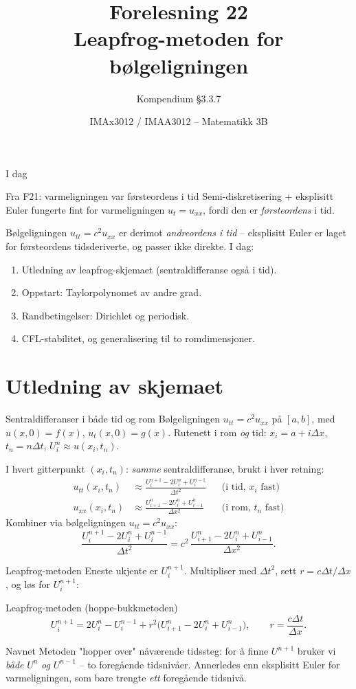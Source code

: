\documentclass[11pt,aspectratio=169]{beamer}
\title[F22 -- Leapfrog]{Forelesning 22\\ Leapfrog-metoden for bølgeligningen}
\subtitle{Kompendium §3.3.7}
\author{IMAx3012 / IMAA3012 -- Matematikk 3B}
\date{}
\begin{document}
\begin{frame}
\titlepage
\end{frame}

\begin{frame}{I dag}
\begin{remb}{Fra F21: varmeligningen var førsteordens i tid}
Semi-diskretisering + eksplisitt Euler fungerte fint for varmeligningen $u_t=u_{xx}$, fordi den er \emph{førsteordens} i tid.
\end{remb}
Bølgeligningen $u_{tt}=c^2u_{xx}$ er derimot \emph{andreordens i tid} -- eksplisitt Euler er laget for førsteordens tidsderiverte, og passer ikke direkte. I dag:
\begin{enumerate}
\item Utledning av leapfrog-skjemaet (sentraldifferanse også i tid).
\item Oppstart: Taylorpolynomet av andre grad.
\item Randbetingelser: Dirichlet og periodisk.
\item CFL-stabilitet, og generalisering til to romdimensjoner.
\end{enumerate}
\end{frame}

\section{Utledning av skjemaet}

\begin{frame}{Sentraldifferanser i både tid og rom}
Bølgeligningen $u_{tt}=c^2u_{xx}$ på $[a,b]$, med $u(x,0)=f(x)$, $u_t(x,0)=g(x)$. Rutenett i rom \emph{og} tid: $x_i=a+i\Delta x$, $t_n=n\Delta t$, $U_i^n\approx u(x_i,t_n)$.

\medskip
I hvert gitterpunkt $(x_i,t_n)$: \emph{samme} sentraldifferanse, brukt i hver retning:
\begin{align*}
u_{tt}(x_i,t_n) &\approx \frac{U_i^{n+1}-2U_i^n+U_i^{n-1}}{\Delta t^2} && \text{(i tid, $x_i$ fast)}\\[0.3em]
u_{xx}(x_i,t_n) &\approx \frac{U_{i+1}^n-2U_i^n+U_{i-1}^n}{\Delta x^2} && \text{(i rom, $t_n$ fast)}
\end{align*}
Kombiner via bølgeligningen $u_{tt}=c^2u_{xx}$:
\[
\frac{U_i^{n+1}-2U_i^n+U_i^{n-1}}{\Delta t^2} = c^2\,\frac{U_{i+1}^n-2U_i^n+U_{i-1}^n}{\Delta x^2}.
\]
\end{frame}

\begin{frame}{Leapfrog-metoden}
Eneste ukjente er $U_i^{n+1}$. Multipliser med $\Delta t^2$, sett $r=c\Delta t/\Delta x$, og løs for $U_i^{n+1}$:
\begin{oppsumb}{Leapfrog-metoden (hoppe-bukkmetoden)}
\[
U_i^{n+1} = 2U_i^n - U_i^{n-1} + r^2\big(U_{i+1}^n-2U_i^n+U_{i-1}^n\big), \qquad r = \frac{c\Delta t}{\Delta x}.
\]
\end{oppsumb}
\begin{remb}{Navnet}
Metoden "hopper over" nåværende tidssteg: for å finne $U^{n+1}$ bruker vi \emph{både} $U^n$ \emph{og} $U^{n-1}$ -- to foregående tidsnivåer. Annerledes enn eksplisitt Euler for varmeligningen, som bare trengte \emph{ett} foregående tidsnivå.
\end{remb}
\end{frame}
\end{document}
